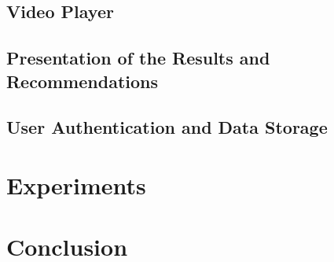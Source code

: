 \section{Video Player}
\label{video_player}

\section{Presentation of the Results and Recommendations}

\section{User Authentication and Data Storage}




\chapter{Experiments}
\label{experiments}


\chapter{Conclusion}
\label{conclusion}




% 